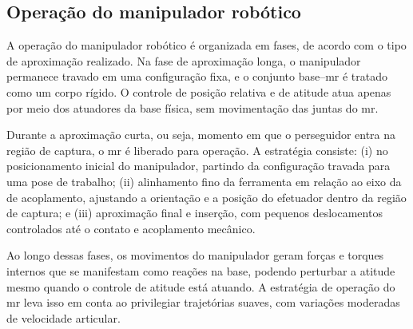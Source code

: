 \subsection{Operação do manipulador robótico}
\label{sec:estrategia_operacao_MR}

A operação do manipulador robótico é organizada em fases, de acordo com o tipo de aproximação realizado.
Na fase de aproximação longa, o manipulador permanece travado em uma configuração fixa, e o conjunto base--\gls{mr} é tratado como um corpo rígido.
O controle de posição relativa e de atitude atua apenas por meio dos atuadores da base física, sem movimentação das juntas do \gls{mr}.

Durante a aproximação curta, ou seja, momento em que o perseguidor entra na região de captura, o \gls{mr} é liberado para operação.
A estratégia consiste:
(i) no posicionamento inicial do manipulador, partindo da configuração travada para uma pose de trabalho;
(ii) alinhamento fino da ferramenta em relação ao eixo da  de acoplamento, ajustando a orientação e a posição do efetuador dentro da região de captura; e
(iii) aproximação final e inserção, com pequenos deslocamentos controlados até o contato e acoplamento mecânico.

Ao longo dessas fases, os movimentos do manipulador geram forças e torques internos que se manifestam como reações na base, podendo perturbar a atitude mesmo quando o controle de atitude está atuando.
A estratégia de operação do \gls{mr} leva isso em conta ao privilegiar trajetórias suaves, com variações moderadas de velocidade articular.